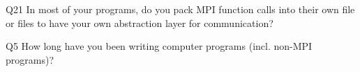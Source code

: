 \begin{description}%
\item{Q21} In most of your programs, do you pack MPI function calls into their own file or files to have your own abstraction layer for communication?%
\item{Q5} How long have you been writing computer programs (incl. non-MPI programs)?%
\end{description}%
